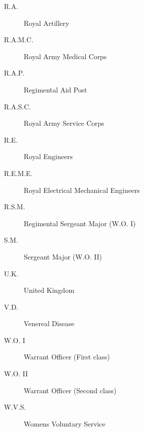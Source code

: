 \begin{description}
\item[R.A.] Royal Artillery
\item[R.A.M.C.] Royal Army Medical Corps
\item[R.A.P.] Regimental Aid Post
\item[R.A.S.C.] Royal Army Service Corps
\item[R.E.] Royal Engineers
\item[R.E.M.E.] Royal Electrical Mechanical Engineers
\item[R.S.M.] Regimental Sergeant Major (W.O. I)
\item[S.M.] Sergeant Major (W.O. II)
\item[U.K.] United Kingdom
\item[V.D.] Venereal Disease
\item[W.O. I] Warrant Officer (First class)
\item[W.O. II] Warrant Officer (Second class)
\item[W.V.S.] Womens Voluntary Service 
\end{description}
